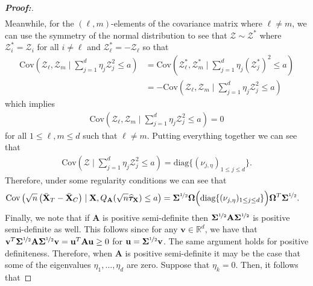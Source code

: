 \documentclass[11pt,twoside]{article}
\theoremstyle{definition}
\theoremstyle{remark}
\begin{document}
\begin{proof}[\textbf{Proof:}]
\begin{align*}
\end{align*}
Meanwhile, for the $(\ell, m)$-elements of the covariance matrix where $\ell \neq m$, we can use the symmetry of the normal distribution to see that $\bm{\mathcal{Z}} \sim \bm{\mathcal{Z}}^*$ where $\mathcal{Z}^*_i = \mathcal{Z}_i$ for all $i \neq \ell$ and $\mathcal{Z}^*_\ell = - \mathcal{Z}_\ell$ so that
\begin{align*}
        \text{Cov}\left(\mathcal{Z}_\ell, \mathcal{Z}_m \mid   \sum^d_{j=1} \eta_j \mathcal{Z}^2_j \leq a \right) &= \text{Cov}\left(\mathcal{Z}^*_\ell, \mathcal{Z}^*_m \mid   \sum^d_{j=1} \eta_j (\mathcal{Z}^*_j)^2 \leq a \right) \\
        &= - \text{Cov}\left(\mathcal{Z}_\ell, \mathcal{Z}_m \mid   \sum^d_{j=1} \eta_j \mathcal{Z}^2_j \leq a \right)
\end{align*}
which implies
\begin{align*}
    \text{Cov}\left(\mathcal{Z}_\ell, \mathcal{Z}_m \mid   \sum^d_{j=1} \eta_j \mathcal{Z}^2_j \leq a \right) = 0
\end{align*}
for all $1 \leq \ell, m \leq d$ such that $\ell \neq m$. Putting everything together we can see that
\begin{align*}
     \text{Cov}\left(\bm{\mathcal{Z}} \mid   \sum^d_{j=1} \eta_j \mathcal{Z}^2_j \leq a\right) = \text{diag}\{(\nu_{j,\eta})_{1\le j\le d}\}.
\end{align*}
Therefore, under some regularity conditions we can see that
\begin{align*}
    \text{Cov}\left(\sqrt{n}\left(\bar{\mathbf{X}}_T - \bar{\mathbf{X}}_C\right) \mid \mathbf{X},  Q_\mathbf{A}(\sqrt{n} \widehat{\bm{\tau}}_{\mathbf{X}}) \leq a\right) &= \mathbf{\Sigma}^{\nicefrac{1}{2}} \mathbf{\Omega} \Big( \text{diag}\{(\nu_{j, \eta})_{1 \leq j \leq d} \} \Big) \mathbf{\Omega}^T \mathbf{\Sigma}^{\nicefrac{1}{2}}.
\end{align*}
Finally, we note that if $\mathbf{A}$ is positive semi-definite then $\mathbf{\Sigma}^{\nicefrac{1}{2}} \mathbf{A}\mathbf{\Sigma}^{\nicefrac{1}{2}}$ is positive semi-definite as well. This follows since for any $\mathbf{v} \in \mathbb{R}^d$, we have that $\mathbf{v}^T \mathbf{\Sigma}^{\nicefrac{1}{2}} \mathbf{A}\mathbf{\Sigma}^{\nicefrac{1}{2}} \mathbf{v} = \mathbf{u}^T \mathbf{A} \mathbf{u} \geq 0$ for $\mathbf{u} = \mathbf{\Sigma}^{\nicefrac{1}{2}} \mathbf{v}$. The same argument holds for positive definiteness. Therefore, when $\mathbf{A}$ is positive semi-definite it may be the case that some of the eigenvalues $\eta_1, \ldots, \eta_d$ are zero. Suppose that $\eta_k = 0$. Then, it follows that

\end{proof}
\end{document}
